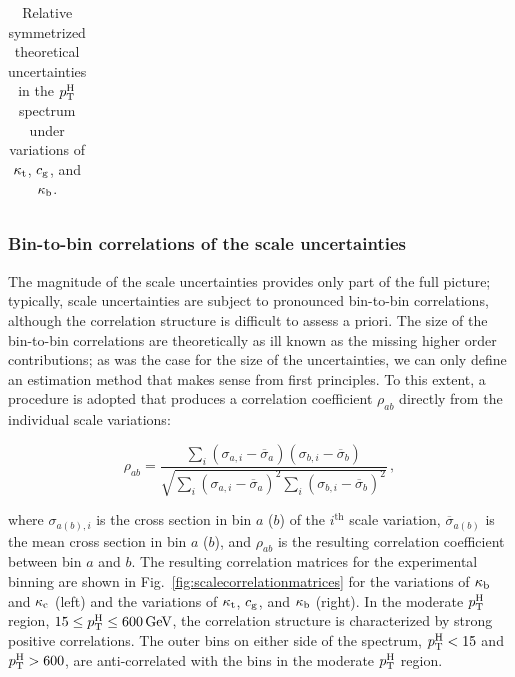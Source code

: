 \begin{table}[htb]
\caption{
    Relative symmetrized theoretical uncertainties in the $p_\mathrm{T}^\mathrm{H}$ spectrum under variations of $\kappa_{\mathrm{t}}$, $c_\mathrm{g}$, and $\kappa_{\mathrm{b}}$.
    }
\label{tab:scaleunc-ktcgkb}
\footnotesize
\begin{center}
\setlength{\tabcolsep}{2pt}
\begin{tabular}{lccccccccc}
\hline

\hline
\end{tabular}
\end{center}
\end{table}


\subsubsection{Bin-to-bin correlations of the scale uncertainties}

The magnitude of the scale uncertainties provides only part of the full picture; typically, scale uncertainties are subject to pronounced bin-to-bin correlations, although the correlation structure is difficult to assess a priori.
% 
The size of the bin-to-bin correlations are theoretically as ill known as the missing higher order contributions; as was the case for the size of the uncertainties, we can only define an estimation method that makes sense from first principles.
% 
To this extent, a procedure is adopted that produces a correlation coefficient $\rho_{ab}$ directly from the individual scale variations:
% 
\begin{linenomath*}
\begin{equation}
\rho_{ab} = 
\frac{
    \sum_i ( \sigma_{a, i} - \overline{\sigma}_a ) ( \sigma_{b, i} - \overline{\sigma}_b )
    }{
    \sqrt{
        \sum_i ( \sigma_{a, i} - \overline{\sigma}_a )^2
        \sum_i ( \sigma_{b, i} - \overline{\sigma}_b )^2
        }
    }
    \,,
\end{equation}
\end{linenomath*}
% 
where $\sigma_{a (b), i}$ is the cross section in bin $a$ ($b$) of the $i^\text{th}$ scale variation, $\overline{\sigma}_{a (b)}$ is the mean cross section in bin $a$ ($b$), and $\rho_{ab}$ is the resulting correlation coefficient between bin $a$ and $b$.
% 
The resulting correlation matrices for the experimental binning are shown in Fig.~\ref{fig:scalecorrelationmatrices} for the variations of $\kappa_{\mathrm{b}}$ and $\kappa_{\mathrm{c}}$ (left) and the variations of $\kappa_{\mathrm{t}}$, $c_\mathrm{g}$, and $\kappa_{\mathrm{b}}$ (right).
% 
In the moderate $p_\mathrm{T}^\mathrm{H}$ region, $15 \leq p_\mathrm{T}^\mathrm{H} \leq 600\,\text{GeV}$, the correlation structure is characterized by strong positive correlations.
% 
The outer bins on either side of the spectrum, $p_\mathrm{T}^\mathrm{H}<15$ and $p_\mathrm{T}^\mathrm{H}>600$\GeV, are anti-correlated with the bins in the moderate $p_\mathrm{T}^\mathrm{H}$ region.

